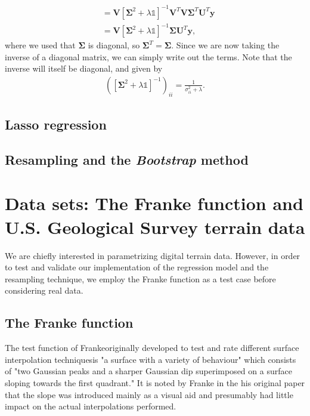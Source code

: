 \documentclass[a4paper]{article}
\begin{document}
\begin{multicols}{2}
\begin{align}
%
&= \mathbf{V}\left[\bm\Sigma^2 +\lambda\mathds{1}\right]^{-1}\mathbf{V}^T \mathbf{V}\bm\Sigma^T \mathbf{U}^T \mathbf{y} \nonumber \\
%
&= \mathbf{V}\left[\bm\Sigma^2 +\lambda\mathds{1}\right]^{-1}\bm\Sigma \mathbf{U}^T \mathbf{y},
\end{align}
where we used that $\bm\Sigma$ is diagonal, so $\bm\Sigma^T =\bm\Sigma$. Since we are now taking the inverse of a diagonal matrix, we can simply write out the terms. Note that the inverse will itself be diagonal, and given by
\begin{align}
\left(\left[\bm\Sigma^2+\lambda\mathds{1}\right]^{-1}\right)_{ii} = \frac{1}{\sigma_{ii}^2+\lambda}.
\end{align}


\subsection{Lasso regression}
\lipsum[3]
\subsection{Resampling and the \textit{Bootstrap} method}
\lipsum[3]

\section{Data sets: The Franke function and U.S. Geological Survey terrain data}
We are chiefly interested in parametrizing digital terrain data. However, in order to test and validate our implementation of the regression model and the resampling technique, we employ the Franke function\autocite{franke1979critical} as a test case before considering real data.
\subsection{The Franke function}
The test function of Franke\textemdash originally developed to test and rate different surface interpolation techniques\textemdash is "a surface with a variety of behaviour" which consists of "two Gaussian peaks and a sharper Gaussian dip superimposed on a surface sloping towards the first quadrant."\autocite{franke1979critical} It is noted by Franke in the his original paper that the slope was introduced mainly as a visual aid and presumably had little impact on the actual interpolations performed. 


\end{multicols}
\end{document}
